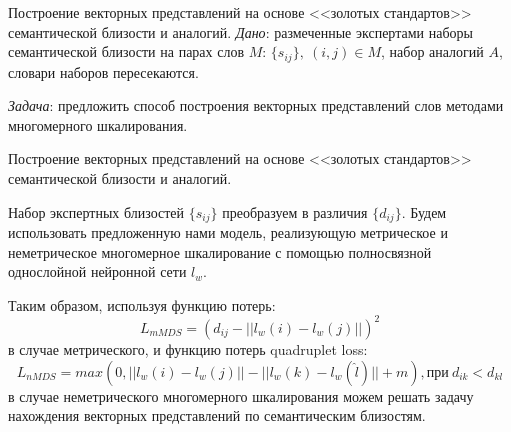 \documentclass[9pt]{beamer}
\begin{document}
\begin{frame}{Построение векторных представлений на основе <<золотых стандартов>> семантической близости и аналогий.}
    \textit{Дано}: размеченные экспертами наборы семантической близости на парах слов $M$: $\{s_{ij}\}, \: (i,j) \in M$, набор аналогий $A$, словари наборов пересекаются. 
\vspace{\baselineskip}

\textit{Задача}: предложить способ построения векторных представлений слов методами многомерного шкалирования.
\end{frame}

\begin{frame}{Построение векторных представлений на основе <<золотых стандартов>> семантической близости и аналогий.}

Набор экспертных близостей $\{s_{ij}\}$ преобразуем в различия $\{d_{ij}\}$. Будем использовать предложенную нами модель, реализующую метрическое и неметрическое многомерное шкалирование с помощью полносвязной однослойной нейронной сети $l_{w}$.
\vspace{\baselineskip}

Таким образом, используя функцию потерь:
\begin{equation}
    L_{mMDS} = (d_{ij} - || l_w(i) - l_w(j) ||)^2
\end{equation}
в случае метрического, и функцию потерь quadruplet loss:
\begin{equation}
    L_{nMDS} = 
                max(0, ||l_w(i) - l_w(j)|| - ||l_w(k) - l_w(\hat{l})|| + m), \text{при} \: d_{ik} < d_{kl}
\end{equation}
в случае неметрического многомерного шкалирования можем решать задачу нахождения векторных представлений по семантическим близостям.
    
\end{frame}
\end{document}

